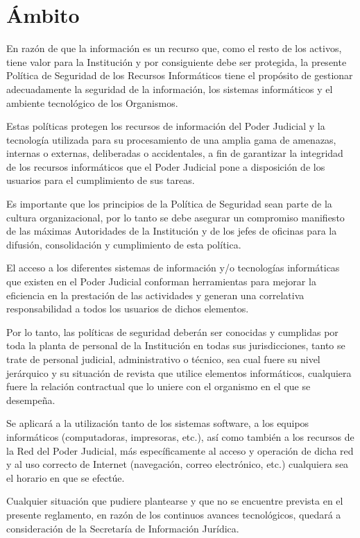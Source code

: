 \documentclass[11pt,bibtotoc,noliststotoc,BCOR0mm]{scrbook}
\begin{document}
\section{Ámbito}

En razón de que la información es un recurso que, como el resto de los activos, tiene valor para la Institución y por consiguiente debe ser protegida, la presente Política de Seguridad de los Recursos Informáticos tiene el propósito de gestionar adecuadamente la seguridad de la información, los sistemas informáticos y el ambiente tecnológico de los Organismos.

Estas políticas protegen los recursos de información del Poder Judicial y la tecnología utilizada para su procesamiento de una amplia gama de amenazas, internas o externas, deliberadas o accidentales, a fin de garantizar la integridad de los recursos informáticos que el Poder Judicial pone a disposición de los usuarios para el cumplimiento de sus tareas.

Es importante que los principios de la Política de Seguridad sean parte de la cultura organizacional, por lo tanto se debe asegurar un compromiso manifiesto de las máximas Autoridades de la Institución y de los jefes de oficinas para la difusión, consolidación y cumplimiento de esta política.

El acceso a los diferentes sistemas de información y/o tecnologías informáticas que existen en el Poder Judicial conforman herramientas para mejorar la eficiencia en la prestación de las actividades y generan una correlativa responsabilidad a todos los usuarios de dichos elementos.

Por lo tanto, las políticas de seguridad deberán ser conocidas y cumplidas por toda la planta de personal de la Institución en todas sus jurisdicciones, tanto se trate de personal judicial, administrativo o técnico, sea cual fuere su nivel jerárquico y su situación de revista que utilice elementos informáticos, cualquiera fuere la relación contractual que lo uniere con el organismo en el que se desempeña.

Se aplicará a la utilización tanto de los sistemas software, a los equipos informáticos (computadoras, impresoras, etc.), así como también a los recursos de la Red del Poder Judicial, más específicamente al acceso y operación de dicha red y al uso correcto de Internet (navegación, correo electrónico, etc.) cualquiera sea el horario en que se efectúe.

Cualquier situación que pudiere plantearse y que no se encuentre prevista en el presente reglamento, en razón de los continuos avances tecnológicos, quedará a consideración de la Secretaría de Información Jurídica.
\end{document}
